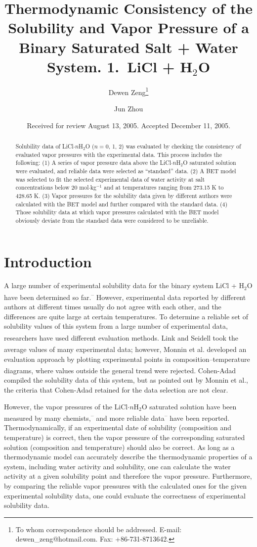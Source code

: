 \documentclass[11pt]{article}
\title{Thermodynamic Consistency of the Solubility and Vapor Pressure of a
Binary Saturated Salt + Water System. 1.\ LiCl + H$_2$O}
\author[1]{Dewen Zeng\thanks{To whom correspondence should be addressed.
E-mail: dewen\_zeng@hotmail.com. Fax: +86-731-8713642.}}
\author[2]{Jun Zhou}
\affil[1]{College of Chemistry and Chemical Engineering, Hunan University,
410082 Changsha, PR China}
\affil[2]{Central-South University, 410083 Changsha, People's Republic of China}
\date{Received for review August 13, 2005. Accepted December 11, 2005.}
\newcommand{\rc}[1]{\textsuperscript{\citenum{#1}}}
\begin{document}
\maketitle

\begin{abstract}
\noindent
Solubility data of LiCl$\cdot n$H$_2$O ($n = 0$, 1, 2) was evaluated by
checking the consistency of evaluated vapor pressures with the experimental
data. This process includes the following: (1) A series of vapor pressure data
above the LiCl$\cdot n$H$_2$O saturated solution were evaluated, and reliable
data were selected as ``standard'' data. (2) A BET model was selected to fit
the selected experimental data of water activity at salt concentrations below
20 mol$\cdot$kg$^{-1}$ and at temperatures ranging from 273.15 K to 428.65 K.
(3) Vapor pressures for the solubility data given by different authors were
calculated with the BET model and further compared with the standard data.
(4) Those solubility data at which vapor pressures calculated with the BET
model obviously deviate from the standard data were considered to be
unreliable.
\end{abstract}

\section*{Introduction}

A large number of experimental solubility data for the binary system
LiCl + H$_2$O have been determined so far.\rc{ref1}\textsuperscript{--}\rc{ref4}
However, experimental data reported by different authors at different times
usually do not agree with each other, and the differences are quite large at
certain temperatures. To determine a reliable set of solubility values of this
system from a large number of experimental data, researchers have used
different evaluation methods. Link and Seidell\rc{ref1} took the average
values of many experimental data; however, Monnin et al.\rc{ref5} developed an
evaluation approach by plotting experimental points in
composition--temperature diagrams, where values outside the general trend were
rejected. Cohen-Adad\rc{ref4} compiled the solubility data of this system, but
as pointed out by Monnin et al., the criteria that Cohen-Adad retained for the
data selection are not clear.

However, the vapor pressures of the LiCl$\cdot n$H$_2$O saturated solution
have been measured by many
chemists,\rc{ref6}\textsuperscript{--}\rc{ref10} and more reliable
data\rc{ref11}\textsuperscript{--}\rc{ref16} have been reported.
Thermodynamically, if an experimental date of solubility (composition and
temperature) is correct, then the vapor pressure of the corresponding
saturated solution (composition and temperature) should also be correct. As
long as a thermodynamic model can accurately describe the thermodynamic
properties of a system, including water activity and solubility, one can
calculate the water activity at a given solubility point and therefore the
vapor pressure. Furthermore, by comparing the reliable vapor pressures with
the calculated ones for the given experimental solubility data, one could
evaluate the correctness of experimental solubility data.
\end{document}
